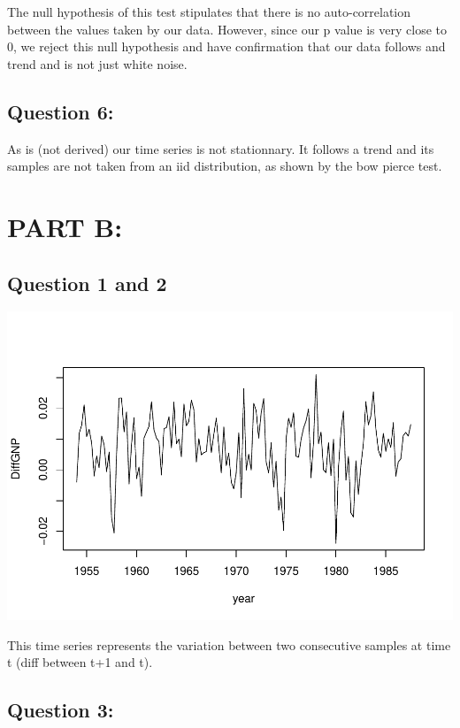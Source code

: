 \documentclass[]{article}
\begin{document}
The null hypothesis of this test stipulates that there is no
auto-correlation between the values taken by our data. However, since
our p value is very close to 0, we reject this null hypothesis and have
confirmation that our data follows and trend and is not just white
noise.

\subsection{Question 6:}\label{question-6}

As is (not derived) our time series is not stationnary. It follows a
trend and its samples are not taken from an iid distribution, as shown
by the bow pierce test.

\section{PART B:}\label{part-b}

\subsection{Question 1 and 2}\label{question-1-and-2-1}

\includegraphics{TP6_Analysis_Dejous_files/figure-latex/unnamed-chunk-4-1.pdf}

This time series represents the variation between two consecutive
samples at time t (diff between t+1 and t).

\subsection{Question 3:}\label{question-3-1}
\end{document}
